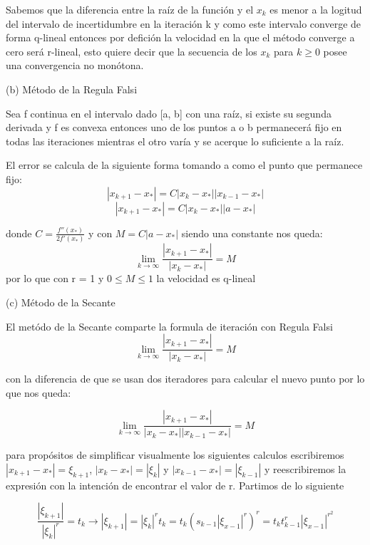 \documentclass[11pt]{article}
\begin{document}
Sabemos que la diferencia entre la raíz de la función y el $x_k$ es menor a la logitud del intervalo de incertidumbre en la iteración k y como este intervalo converge de forma q-lineal entonces por defición la velocidad en la que el método converge a cero será r-lineal, esto quiere decir que la secuencia de los ${x_k}$ para ${k\geq 0}$ posee una convergencia no monótona.
\vspace{0.5cm}

{\large (b) Método de la Regula Falsi}

Sea f continua en el intervalo dado [a, b] con una raíz, si existe su segunda derivada y f es convexa entonces uno de los puntos a o b permanecerá fijo en todas las iteraciones mientras el otro varía y se acerque lo suficiente a la raíz.

El error se calcula de la siguiente forma tomando a como el punto que permanece fijo:
$$|x_{k+1}-x_*| = C |x_{k}-x_*| |x_{k-1}-x_*|$$ 
$$|x_{k+1}-x_*| = C |x_{k}-x_*| |a-x_*|$$ 

donde $C = \frac{f''(x_*)}{2f'(x_*)}$ y con $M = C|a-x_*|$ siendo una constante nos queda:
$$\lim_{k \to \infty}{\frac{|x_{k+1}-x_*|}{|x_k-x_*|}} = M$$
por lo que con r = 1 y $0 \leq M \leq 1 $ la velocidad es q-lineal

\vspace{0.5cm}

{\large (c) Método de la Secante}


El metódo de la Secante comparte la formula de iteración con Regula Falsi 
$$\lim_{k \to \infty}{\frac{|x_{k+1}-x_*|}{|x_k-x_*|}} = M$$

con la diferencia de que se usan dos iteradores para calcular el nuevo punto por lo que nos queda:

$$\lim_{k \to \infty}{\frac{|x_{k+1}-x_*|}{|x_k-x_*| |x_{k-1}-x_*|}} = M$$

para propósitos de simplificar visualmente los siguientes calculos escribiremos $|x_{k+1}-x_*| = \xi_{k+1}$, $|x_{k}-x_*| =|\xi_{k}|$ y $|x_{k-1}-x_*| = |\xi_{k-1}|$ y reescribiremos la expresión con la intención de encontrar el valor de r. Partimos de lo siguiente

$$\frac{|\xi_{k+1}|}{|\xi_{k}|^r} = t_k \to |\xi_{k+1}| = |\xi_{k}|^r t_k = t_k(s_{k-1}|\xi_{x-1}|^r)^r = t_k t^r_{k-1}|\xi_{x-1}|^{r^2} $$
\end{document}
